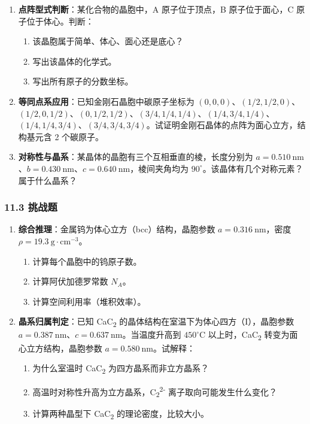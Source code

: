 \documentclass[a4paper,11pt]{ctexart}
\providecommand{\tightlist}{\setlength{\itemsep}{0pt}\setlength{\parskip}{0pt}}
\begin{document}
\begin{enumerate}
\def\labelenumi{\arabic{enumi}.}
\setcounter{enumi}{3}
\item
  \textbf{点阵型式判断}：某化合物的晶胞中，A 原子位于顶点，B 原子位于面心，C 原子位于体心。判断：

  \begin{enumerate}
  \def\labelenumii{(\arabic{enumii})}
  \tightlist
  \item
    该晶胞属于简单、体心、面心还是底心？
  \item
    写出该晶体的化学式。
  \item
    写出所有原子的分数坐标。
  \end{enumerate}
\item
  \textbf{等同点系应用}：已知金刚石晶胞中碳原子坐标为 \((0, 0, 0)\)、\((1/2, 1/2, 0)\)、\((1/2, 0, 1/2)\)、\((0, 1/2, 1/2)\)、\((3/4, 1/4, 1/4)\)、\((1/4, 3/4, 1/4)\)、\((1/4, 1/4, 3/4)\)、\((3/4, 3/4, 3/4)\)。试证明金刚石晶体的点阵为面心立方，结构基元含 2 个碳原子。
\item
  \textbf{对称性与晶系}：某晶体的晶胞有三个互相垂直的棱，长度分别为 \(a = 0.510\ \mathrm{nm}\)、\(b = 0.430\ \mathrm{nm}\)、\(c = 0.640\ \mathrm{nm}\)，棱间夹角均为 \(90^\circ\)。该晶体有几个对称元素？属于什么晶系？
\end{enumerate}

\subsubsection{11.3 挑战题}\label{ux6311ux6218ux9898}

\begin{enumerate}
\def\labelenumi{\arabic{enumi}.}
\setcounter{enumi}{6}
\tightlist
\item
  \textbf{综合推理}：金属钨为体心立方（bcc）结构，晶胞参数 \(a = 0.316\ \mathrm{nm}\)，密度 \(\rho = 19.3\ \mathrm{g\cdot cm^{-3}}\)。

  \begin{enumerate}
  \def\labelenumii{(\arabic{enumii})}
  \tightlist
  \item
    计算每个晶胞中的钨原子数。
  \item
    计算阿伏加德罗常数 \(N_A\)。
  \item
    计算空间利用率（堆积效率）。
  \end{enumerate}
\item
  \textbf{晶系归属判定}：已知 CaC\textsubscript{2} 的晶体结构在室温下为体心四方（I），晶胞参数 \(a = 0.387\ \mathrm{nm}\)、\(c = 0.637\ \mathrm{nm}\)。当温度升高到 \(450^\circ\mathrm{C}\) 以上时，CaC\textsubscript{2} 转变为面心立方结构，晶胞参数 \(a = 0.580\ \mathrm{nm}\)。试解释：

  \begin{enumerate}
  \def\labelenumii{(\arabic{enumii})}
  \tightlist
  \item
    为什么室温时 CaC\textsubscript{2} 为四方晶系而非立方晶系？
  \item
    高温时对称性升高为立方晶系，C\textsubscript{2}\textsuperscript{2-} 离子取向可能发生什么变化？
  \item
    计算两种晶型下 CaC\textsubscript{2} 的理论密度，比较大小。
  \end{enumerate}
\end{enumerate}
\end{document}

